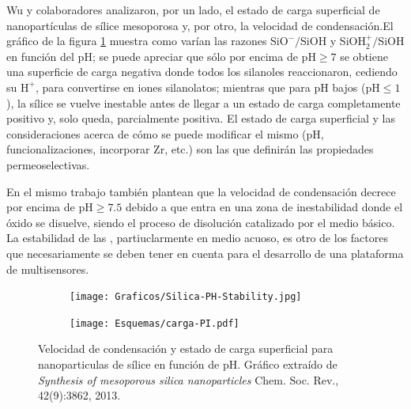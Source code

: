      Wu y colaboradores\cite{Si-HanWu2013} analizaron, por un lado, el estado de carga superficial de nanopartículas de sílice mesoporosa y, por otro, la velocidad de condensación.\pagebreak El gráfico de la figura \ref{fig:silica_ph} muestra como varían las razones  $\text{SiO}^{-}/\text{SiOH}$ y $\text{SiOH}_2^{+}/\text{SiOH}$ en función del pH; se puede apreciar que sólo por encima de $\text{pH}\geq7$ se obtiene una superficie de carga negativa donde todos los silanoles reaccionaron, cediendo su $\text{H}^{+}$, para convertirse en iones silanolatos; mientras que para pH bajos ($\text{pH}\leq1$), la sílice se vuelve inestable antes de llegar a un estado de carga completamente positivo y, solo queda, parcialmente positiva. El estado de carga superficial y las consideraciones acerca de cómo se puede modificar el mismo (pH, funcionalizaciones, incorporar Zr, etc.) son las que definirán las propiedades permeoselectivas.  
	 
	 En el mismo trabajo\cite{Si-HanWu2013} también plantean que la velocidad de condensación decrece por encima de $\text{pH}\geq7.5$ debido a que entra en una zona de inestabilidad donde el óxido se disuelve, siendo el proceso de disolución catalizado por el medio básico. La estabilidad de las \pdm, partiuclarmente en medio acuoso, es otro de los factores que necesariamente se deben  tener en cuenta para el desarrollo de una plataforma de multisensores. 


		\begin{figure}[h!]
			\begin{subfigure}[t]{0.73\textwidth}
 	       	\texttt{[image: Graficos/Silica-PH-Stability.jpg]}
 	       	\end{subfigure}
 	       	\begin{subfigure}[t]{0.25\textwidth}
 	       	 	\texttt{[image: Esquemas/carga-PI.pdf]}
	      	 \end{subfigure}
	    	\caption[Velocidad de condensación y estado de carga superficial]{Velocidad de condensación y estado de carga superficial para nanoparticulas de sílice en función de pH. Gráfico extraído de \textit{Synthesis of mesoporous silica nanoparticles} Chem. Soc. Rev., 42(9):3862, 2013.\cite{Si-HanWu2013}}
	       	\label{fig:silica_ph}
	    	\end{figure}
	    	
